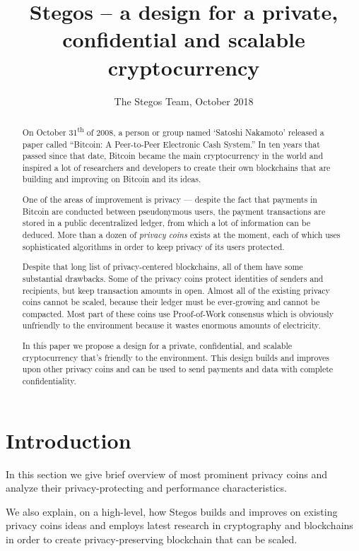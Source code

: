 \documentclass[a4paper, 10pt, conference]{ieeeconf}
\title{\LARGE \bf
Stegos  -- a design for a private, confidential and scalable cryptocurrency}
\author{The Stegos Team, October 2018}%
\begin{document}
\maketitle
\thispagestyle{empty}
\pagestyle{empty}


\begin{abstract}
    On October 31\textsuperscript{th} of 2008, a person or group named ‘Satoshi Nakamoto’ released a paper called ``Bitcoin: A Peer-to-Peer Electronic Cash System.''\cite{c1} In ten years that passed since that date, Bitcoin became the main cryptocurrency in the world and inspired a lot of researchers and developers to create their own blockchains that are building and improving on Bitcoin and its ideas.
    
    One of the areas of improvement is privacy --- despite the fact that payments in Bitcoin are conducted between pseudonymous users, the payment transactions are stored in a public decentralized ledger, from which a lot of information can be deduced. More than a dozen of \textit{privacy coins} exists at the moment, each of which uses sophisticated algorithms in order to keep privacy of its users protected. 
    
    Despite that long list of privacy-centered blockchains, all of them have some substantial drawbacks. Some of the privacy coins protect identities of senders and recipients, but keep transaction amounts in open. Almost all of the existing privacy coins cannot be scaled, because their ledger must be ever-growing and cannot be compacted. Most part of these coins use Proof-of-Work consensus which is obviously unfriendly to the environment because it wastes enormous amounts of electricity. 
    
    In this paper we propose a design for a private, confidential, and scalable cryptocurrency that’s friendly to the environment. This design builds and improves upon other privacy coins and can be used to send payments and data with complete confidentiality. 
\end{abstract}

\section{Introduction}
In this section we give brief overview of most prominent privacy coins and analyze their privacy-protecting and performance characteristics.

We also explain, on a high-level, how Stegos builds and improves on existing privacy coins ideas and employs latest research in cryptography and blockchains in order to create privacy-preserving blockchain that can be scaled. 
\end{document}
